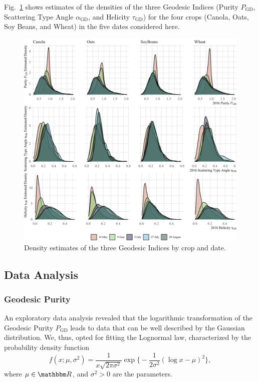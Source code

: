 \documentclass[journal]{IEEEtran}
\begin{document}
{Fig.~\ref{fig:AllIndexes} shows estimates of the densities of the three Geodesic Indices (Purity $P_{\text{GD}}$, Scattering Type Angle $\alpha_{\text{GD}}$, and Helicity $\tau_{\text{GD}}$) for the four crops (Canola, Oats, Soy Beans, and Wheat) in the five dates considered here.

\begin{figure}[htb]
	\centering
	\includegraphics[width=\linewidth]{Indexes}
	\caption{Density estimates of the three Geodesic Indices by crop and date.}\label{fig:AllIndexes}
\end{figure}

\subsection{Data Analysis}

\subsubsection{Geodesic Purity}

An exploratory data analysis revealed that the logarithmic transformation of the Geodesic Purity $P_{\text{GD}}$ leads to data that can be well described by the Gaussian distribution.
We, thus, opted for fitting the Lognormal law, characterized by the probability density function
\begin{equation}
	f(x;\mu,\sigma^2) = \frac{1}{x\sqrt{2\pi\sigma^2} } \exp\Big\{
	-\frac1{2 \sigma^2}(\log x - \mu)^2
	\Big\},
\end{equation}
where $\mu\in\mathbbm R$, and $\sigma^2>0$ are the parameters.

}
\end{document}
